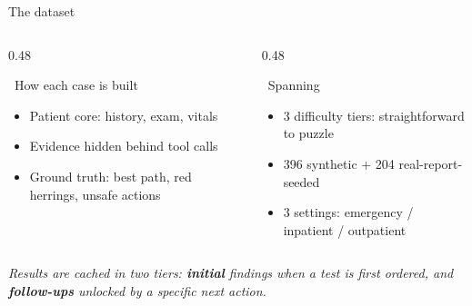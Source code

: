 \documentclass[aspectratio=169,t]{beamer}
\begin{document}
\begin{frame}{The dataset}
  \vspace{1mm}
  \begin{columns}[T,onlytextwidth]
    \begin{column}{0.48\textwidth}
      \begin{block}{{\color{CERNblue}\faSitemap}\;\, How each case is built}
        \footnotesize
        \begin{itemize}\setlength\itemsep{0.2em}
          \item Patient core: history, exam, vitals
          \item Evidence hidden behind tool calls
          \item Ground truth: best path, red herrings, unsafe actions
        \end{itemize}
      \end{block}
    \end{column}%
    \hfill
    \begin{column}{0.48\textwidth}
      \begin{alertblock}{{\color{CERNorange}\faThLarge}\;\, Spanning}
        \footnotesize
        \begin{itemize}\setlength\itemsep{0.2em}
          \item 3 difficulty tiers: straightforward to puzzle
          \item 396 synthetic + 204 real-report-seeded
          \item 3 settings: emergency / inpatient / outpatient
        \end{itemize}
      \end{alertblock}
    \end{column}
  \end{columns}

  \vspace{1mm}
  \centering\scriptsize\itshape\color{CERNtextdark}
  Results are cached in two tiers: \textbf{initial} findings when a test is
  first ordered, and \textbf{follow-ups} unlocked by a specific next action.
\end{frame}
\end{document}
